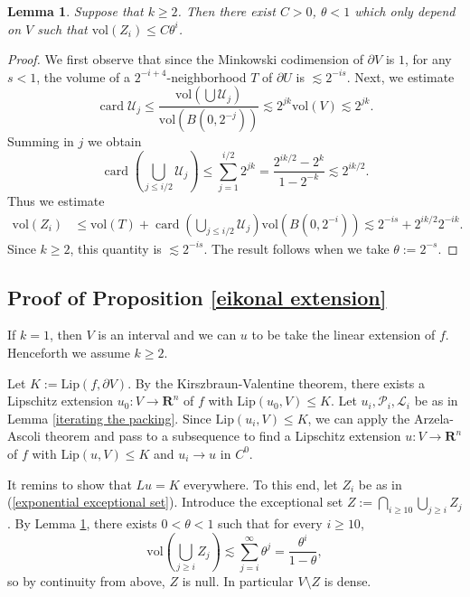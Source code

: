 \documentclass[reqno,11pt]{amsart}
\newcommand{\RR}{\mathbf{R}}
\DeclareMathOperator{\card}{card}
\newcommand{\vol}{\mathrm{vol}}
\newcommand{\Lip}{\mathrm{Lip}}
\newtheorem{lemma}[theorem]{Lemma}
\theoremstyle{definition}
\numberwithin{equation}{section}
\begin{document}
\begin{lemma}\label{decay of the exceptional set}
Suppose that $k \geq 2$.
Then there exist $C > 0$, $\theta < 1$ which only depend on $V$ such that $\vol(Z_i) \leq C\theta^i$.
\end{lemma}
\begin{proof}
We first observe that since the Minkowski codimension of $\partial V$ is $1$, for any $s < 1$, the volume of a $2^{-i+4}$-neighborhood $T$ of $\partial U$ is $\lesssim 2^{-is}$.
Next, we estimate
$$\card \mathscr U_j \leq \frac{\vol(\bigcup \mathscr U_j)}{\vol(B(0, 2^{-j}))} \lesssim 2^{jk} \vol(V) \lesssim 2^{jk}.$$
Summing in $j$ we obtain 
$$\card\left(\bigcup_{j \leq i/2} \mathscr U_j\right) \leq \sum_{j=1}^{i/2} 2^{jk} = \frac{2^{ik/2} - 2^k}{1 - 2^{-k}} \lesssim 2^{ik/2}.$$
Thus we estimate
\begin{align*}
\vol(Z_i)
&\leq \vol(T) + \card\left(\bigcup_{j \leq i/2} \mathscr U_j\right) \vol(B(0, 2^{-i})) 
\lesssim 2^{-is} + 2^{ik/2} 2^{-ik}.
\end{align*}
Since $k \geq 2$, this quantity is $\lesssim 2^{-is}$. 
The result follows when we take $\theta := 2^{-s}$.
\end{proof}

\subsection{Proof of Proposition \ref{eikonal extension}}
If $k = 1$, then $V$ is an interval and we can $u$ to be take the linear extension of $f$.
Henceforth we assume $k \geq 2$.

Let $K := \Lip(f, \partial V)$.
By the Kirszbraun-Valentine theorem, there exists a Lipschitz extension $u_0: V \to \RR^n$ of $f$ with $\Lip(u_0, V) \leq K$.
Let $u_i, \mathscr P_i, \mathscr L_i$ be as in Lemma \ref{iterating the packing}.
Since $\Lip(u_i, V) \leq K$, we can apply the Arzela-Ascoli theorem and pass to a subsequence to find a Lipschitz extension $u: V \to \RR^n$ of $f$ with $\Lip(u, V) \leq K$ and $u_i \to u$ in $C^0$.

It remins to show that $Lu = K$ everywhere.
To this end, let $Z_i$ be as in (\ref{exponential exceptional set}).
Introduce the exceptional set $Z := \bigcap_{i \geq 10} \bigcup_{j \geq i} Z_j$.
By Lemma \ref{decay of the exceptional set}, there exists $0 < \theta < 1$ such that for every $i \geq 10$,
$$\vol\left(\bigcup_{j \geq i} Z_j\right) \lesssim \sum_{j = i}^\infty \theta^j = \frac{\theta^i}{1 - \theta},$$
so by continuity from above, $Z$ is null.
In particular $V \setminus Z$ is dense.
\end{document}
